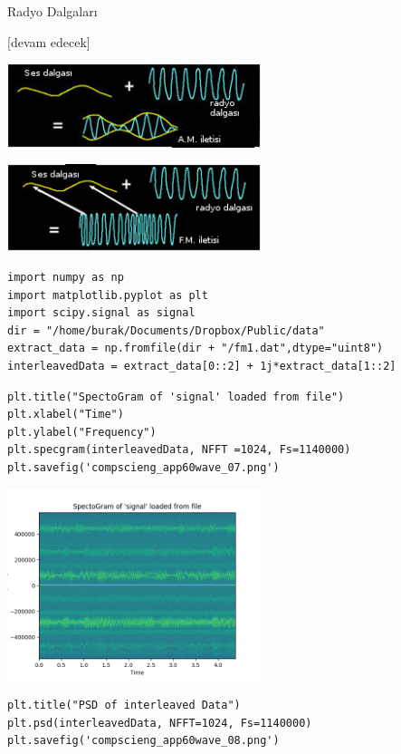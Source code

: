 \documentclass[12pt,fleqn]{article}\usepackage{../../common}
\begin{document}
Radyo Dalgaları

[devam edecek]

\includegraphics[width=20em]{AM_waves.jpg}

\includegraphics[width=20em]{FM_waves.jpg}

\begin{verbatim}
import numpy as np
import matplotlib.pyplot as plt
import scipy.signal as signal
dir = "/home/burak/Documents/Dropbox/Public/data"
extract_data = np.fromfile(dir + "/fm1.dat",dtype="uint8")
interleavedData = extract_data[0::2] + 1j*extract_data[1::2]
\end{verbatim}

\begin{verbatim}
plt.title("SpectoGram of 'signal' loaded from file")
plt.xlabel("Time")
plt.ylabel("Frequency")
plt.specgram(interleavedData, NFFT =1024, Fs=1140000)
plt.savefig('compscieng_app60wave_07.png')
\end{verbatim}

\includegraphics[width=20em]{compscieng_app60wave_07.png}

\begin{verbatim}
plt.title("PSD of interleaved Data")
plt.psd(interleavedData, NFFT=1024, Fs=1140000)
plt.savefig('compscieng_app60wave_08.png')
\end{verbatim}
\end{document}
